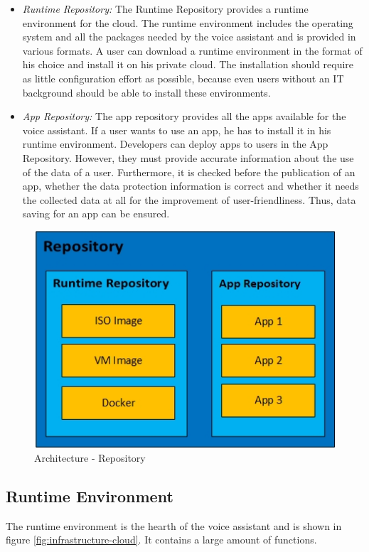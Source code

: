 \begin{itemize}
	\item \textsl{Runtime Repository:} The Runtime Repository provides a runtime environment for the cloud. The runtime environment includes the operating system and all the packages needed by the voice assistant and is provided in various formats. A user can download a runtime environment in the format of his choice and install it on his private cloud. The installation should require as little configuration effort as possible, because even users without an IT background should be able to install these environments. 
	\item \textsl{App Repository:} The app repository provides all the apps available for the voice assistant. If a user wants to use an app, he has to install it in his runtime environment. Developers can deploy apps to users in the App Repository. However, they must provide accurate information about the use of the data of a user. Furthermore, it is checked before the publication of an app, whether the data protection information is correct and whether it needs the collected data at all for the improvement of user-friendliness. Thus, data saving for an app can be ensured.
\end{itemize}


\begin{figure}[h!]
	\centering
	\includegraphics[width=0.6\linewidth]{Picture/Infrastruktur-Repository.jpg}
	\caption[Architecture - Mobile App]{Architecture - Repository}
	\label{fig:infrastructure-repository}
\end{figure}

\subsection{Runtime Environment}
The runtime environment is the hearth of the voice assistant and is shown in figure \ref{fig:infrastructure-cloud}. It contains a large amount of functions.

